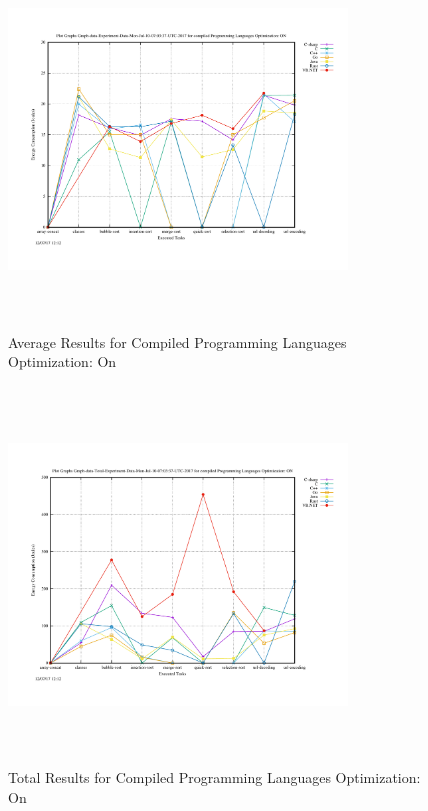 \begin{figure}
	\centering
	\includegraphics[width=9cm,height=10cm,keepaspectratio]{"Graph_Graph-data-Experiment-Data-Mon-Jul-10-07:03:37-UTC-2017_compiled_Optimization_On"}
	\caption{Average Results for Compiled Programming Languages Optimization: On}
	\label{Compiled with Optimization Option}
\end{figure}

\begin{figure}
	\centering
	\includegraphics[width=9cm,height=10cm,keepaspectratio]{"Graph_Graph-data-Total-Experiment-Data-Mon-Jul-10-07:03:37-UTC-2017_compiled_Optimization_On"}
	\caption{Total Results for Compiled Programming Languages Optimization: On}
	\label{Compiled with Optimization Total}
\end{figure}

